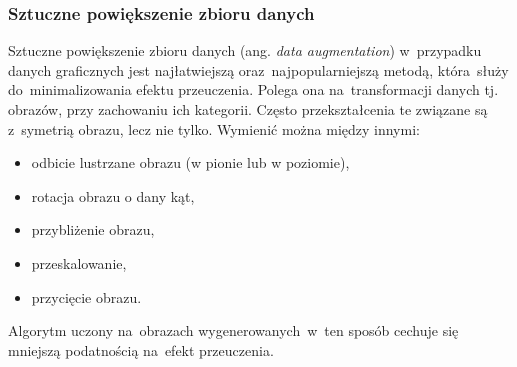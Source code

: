\subsubsection{Sztuczne powiększenie zbioru danych}
Sztuczne powiększenie zbioru danych (ang. \textit{data augmentation}) w~przypadku danych graficznych jest najłatwiejszą oraz~najpopularniejszą metodą, która~służy do~minimalizowania efektu przeuczenia\cite{dataaugment}. Polega ona na~transformacji danych tj. obrazów, przy zachowaniu ich kategorii. Często przekształcenia te związane są z~symetrią obrazu, lecz nie tylko. Wymienić można między innymi:
\begin{itemize}
\item odbicie lustrzane obrazu (w pionie lub w poziomie),
\item rotacja obrazu o dany kąt,
\item przybliżenie obrazu,
\item przeskalowanie,
\item przycięcie obrazu.
\end{itemize}
Algorytm uczony na~obrazach wygenerowanych~w~ten sposób  cechuje się mniejszą podatnością na~efekt przeuczenia. 
